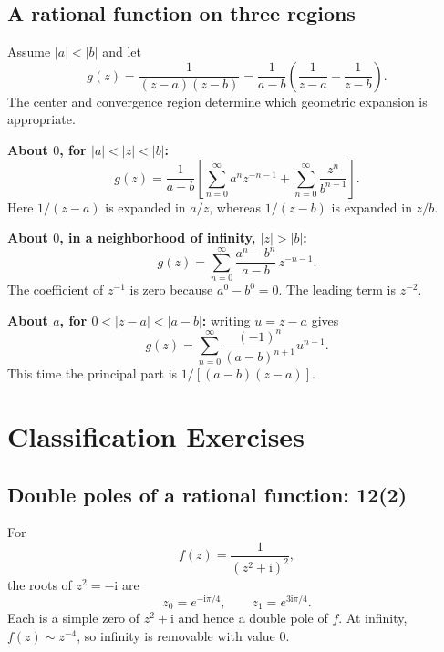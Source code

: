 \documentclass[11pt,a4paper]{article}
\theoremstyle{definition}
\theoremstyle{plain}
\begin{document}
\subsection{A rational function on three regions}
Assume $|a|<|b|$ and let
\begin{equation}\label{eq:12}
g(z)=\frac1{(z-a)(z-b)}
     =\frac1{a-b}\left(\frac1{z-a}-\frac1{z-b}\right).
\end{equation}
The center and convergence region determine which geometric expansion
is appropriate.

\textbf{About $0$, for $|a|<|z|<|b|$:}
\begin{equation}\label{eq:13}
\boxed{g(z)=\frac1{a-b}\left[
       \sum_{n=0}^{\infty}a^nz^{-n-1}
       +\sum_{n=0}^{\infty}\frac{z^n}{b^{n+1}}\right].}
\end{equation}
Here $1/(z-a)$ is expanded in $a/z$, whereas $1/(z-b)$ is expanded in $z/b$.

\textbf{About $0$, in a neighborhood of infinity, $|z|>|b|$:}
\begin{equation}\label{eq:14}
\boxed{g(z)=\sum_{n=0}^{\infty}
               \frac{a^n-b^n}{a-b}\,z^{-n-1}.}
\end{equation}
The coefficient of $z^{-1}$ is zero because $a^0-b^0=0$.
The leading term is $z^{-2}$.

\textbf{About $a$, for $0<|z-a|<|a-b|$:} writing $u=z-a$ gives
\begin{equation}\label{eq:15}
\boxed{g(z)=\sum_{n=0}^{\infty}
             \frac{(-1)^n}{(a-b)^{n+1}}u^{n-1}.}
\end{equation}
This time the principal part is $1/[(a-b)(z-a)]$.

\section{Classification Exercises}
\subsection{Double poles of a rational function: 12(2)}
For
\begin{equation}\label{eq:16}
f(z)=\frac1{(z^2+\mathrm{i})^2},
\end{equation}
the roots of $z^2=-\mathrm{i}$ are
\begin{equation}\label{eq:17}
z_0=e^{-\mathrm{i}\pi/4},\qquad z_1=e^{3\mathrm{i}\pi/4}.
\end{equation}
Each is a simple zero of $z^2+\mathrm{i}$ and hence a double pole of $f$.
At infinity, $f(z)\sim z^{-4}$, so infinity is removable with value $0$.
\end{document}
